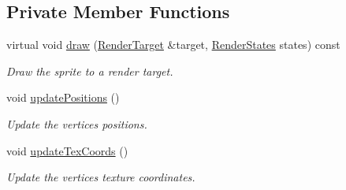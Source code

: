 \subsection*{Private Member Functions}
\begin{DoxyCompactItemize}
\item 
virtual void \mbox{\hyperlink{classsf_1_1_sprite_ad6ab20148c4ba6d6fc33a4aaf5eb838b}{draw}} (\mbox{\hyperlink{classsf_1_1_render_target}{Render\+Target}} \&target, \mbox{\hyperlink{classsf_1_1_render_states}{Render\+States}} states) const
\begin{DoxyCompactList}\small\item\em Draw the sprite to a render target. \end{DoxyCompactList}\item 
void \mbox{\hyperlink{classsf_1_1_sprite_adc47a06b1f326ee3eb2dea65167c8b43}{update\+Positions}} ()
\begin{DoxyCompactList}\small\item\em Update the vertices\textquotesingle{} positions. \end{DoxyCompactList}\item 
void \mbox{\hyperlink{classsf_1_1_sprite_ae5e26f96031b2c0727fc27fd602feb5c}{update\+Tex\+Coords}} ()
\begin{DoxyCompactList}\small\item\em Update the vertices\textquotesingle{} texture coordinates. \end{DoxyCompactList}\end{DoxyCompactItemize}
